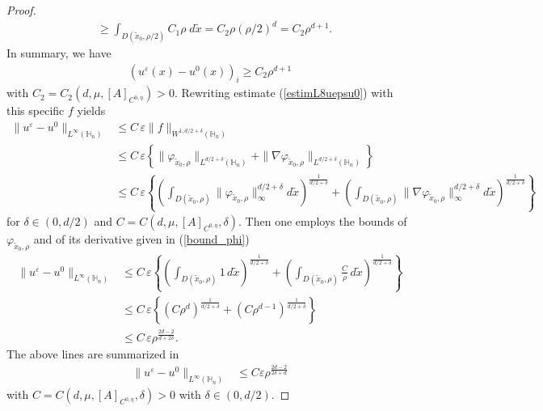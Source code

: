 \documentclass[11pt, reqno]{amsart}
\theoremstyle{definition}
\theoremstyle{remark}
\numberwithin{equation}{section}
\begin{document}
\begin{proof}[Proof]
\begin{align*}
				&\geq  \int_{D(\tilde{x}_0,\rho/2)}  C_1 \rho \; d\tilde{x} = C_2 \rho (\rho/2)^{d} = C_2 \rho^{d+1}.
			\end{align*}	
			In summary, we have 
			\begin{align}
				(u^\varepsilon (x) -u^0(x))_i \geq C_2 \rho^{d+1}\label{boundrho1}
			\end{align}	with	$C_2=C_2(d,\mu,[A]_{C^{0,\eta}})>0$. 
			Rewriting  estimate (\ref{estimL8uepsu0}) with this specific $f$  yields 
			\begin{align*}
				\|u^{\varepsilon} - u^0\|_{L^\infty(\mathbb{H}_n)} &\leq C\, \varepsilon \| f \|_{W^{1,d/2+\delta}(\mathbb{H}_n)} \\
				&\leq C \, \varepsilon \left\{  \|  \varphi_{\tilde{x}_0, \rho}\|_{L^{d/2+\delta}(\mathbb{H}_n)} +\| \nabla \varphi_{\tilde{x}_0, \rho} \|_{L^{d/2+\delta}(\mathbb{H}_n)}   \right\}    \\
				&\leq C\, \varepsilon \left\{  \left(  \int_{D(\tilde{x}_0,\rho)}\|  \varphi_{\tilde{x}_0, \rho}\|^{d/2+\delta } _\infty d\tilde{x}  \right)^{\frac{1}{d/2+\delta  }}   +  \left(\int_{D(\tilde{x}_0,\rho)}    \| \nabla \varphi_{\tilde{x}_0, \rho} \|^{d/2+\delta }_\infty d\tilde{x} \right)^{\frac{1}{d/2+\delta  }} \right\}  
			\end{align*}
			for $\delta\in(0,d/2)$ and $C=C(d,\mu,[A]_{C^{0,\eta}}, \delta  )$.
			Then one employs the bounds of $\varphi_{\tilde{x}_0, \rho}$ and of its derivative given in (\ref{bound_phi})
			\begin{align*}
				\|u^{\varepsilon} - u^0\|_{L^\infty(\mathbb{H}_n)} 
				&\leq C \, \varepsilon \left\{  \left(  \int_{D(\tilde{x}_0,\rho)}\!\! 1\, d\tilde{x}  \right)^{\frac{1}{d/2+\delta}}   +  \left(\int_{D(\tilde{x}_0,\rho)}  \frac{C}{\rho} \, d\tilde{x} \right)^{\frac{1}{d/2+\delta }} \right\}    \\
				&\leq C \, \varepsilon \left\{  \left( C\rho ^d  \right)^{\frac{1}{d/2+\delta }}   +  \left( C\rho^{d-1} \right)^{\frac{1}{d/2+\delta }} \right\}    \\
				&\leq C \, \varepsilon \rho^{\frac{2d-2}{d+2\delta}}  .
			\end{align*}	
			The above lines are summarized in
			\begin{align}
				\|u^{\varepsilon} - u^0\|_{L^\infty(\mathbb{H}_n)} 
				&\leq C  \varepsilon \rho^{\frac{2d-2}{2\delta +d }} \label{boundrho2}
			\end{align}with $C=C (d,\mu,[A]_{C^{0,\eta}}, \delta  )>0$  	with  $\delta\in(0,d/2)$.
			

\end{proof}
\end{document}
